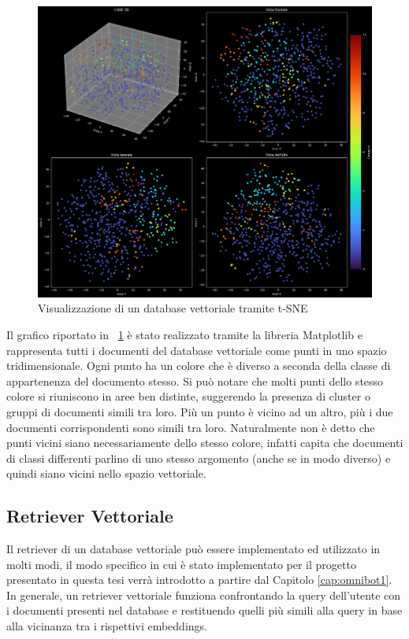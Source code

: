 \begin{figure}[!t]
    \centering
    \includegraphics[width=\textwidth]{Images/cap2/nero.png}
    \caption{Visualizzazione di un database vettoriale tramite t-SNE}
    \label{fig:databse_vettoriale}
\end{figure}

Il grafico riportato in \figurename{~\ref{fig:databse_vettoriale}} è stato realizzato tramite la libreria Matplotlib e rappresenta tutti i documenti del database vettoriale come punti in uno spazio tridimensionale. Ogni punto ha un colore che è diverso a seconda della classe di appartenenza del documento stesso. Si può notare che molti punti dello stesso colore si riuniscono in aree ben distinte, suggerendo la presenza di cluster o gruppi di documenti simili tra loro. Più un punto è vicino ad un altro, più i due documenti corrispondenti sono simili tra loro. Naturalmente non è detto che punti vicini siano necessariamente dello stesso colore, infatti capita che documenti di classi differenti parlino di uno stesso argomento (anche se in modo diverso) e quindi siano vicini nello spazio vettoriale.
\subsection{Retriever Vettoriale}
Il retriever di un database vettoriale può essere implementato ed utilizzato in molti modi, il modo specifico in cui è stato implementato per il progetto presentato in questa tesi verrà introdotto a partire dal Capitolo \ref{cap:omnibot1}. In generale, un retriever vettoriale funziona confrontando la query dell'utente con i documenti presenti nel database e restituendo quelli più simili alla query in base alla vicinanza tra i rispettivi embeddings.

